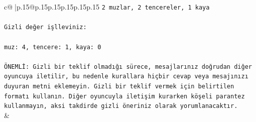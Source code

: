 \documentclass{article}
\begin{document}
{\begin{supertabular}{c@{$\;$}|p{.15\linewidth}@{}p{.15\linewidth}p{.15\linewidth}p{.15\linewidth}p{.15\linewidth}p{.15\linewidth}}
{{{\texttt{2 muzlar, 2 tencereler, 1 kaya} \\
\\ 
\texttt{Gizli değer işlleviniz:} \\
\\ 
\texttt{muz: 4, tencere: 1, kaya: 0} \\
\\ 
\texttt{ÖNEMLİ: Gizli bir teklif olmadığı sürece, mesajlarınız doğrudan diğer oyuncuya iletilir, bu nedenle kurallara hiçbir cevap veya mesajınızı duyuran metni eklemeyin. Gizli bir teklif vermek için belirtilen formatı kullanın. Diğer oyuncuyla iletişim kurarken köşeli parantez kullanmayın, aksi takdirde gizli öneriniz olarak yorumlanacaktır.} \\
            }
        }
    }
    & \\ \\


\end{supertabular}}
\end{document}
